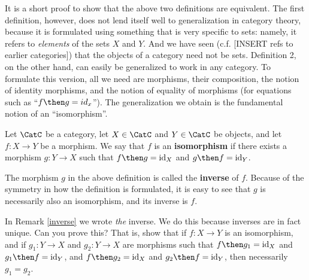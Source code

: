 It is a short proof to show that the above two definitions are equivalent. The first definition, however, does not lend itself well to generalization in category theory, because it is formulated using something that is very specific to sets: namely, it refers to \emph{elements} of the sets $X$ and $Y$. And we have seen (c.f. [INSERT refs to earlier categories]) that the objects of a category need not be sets. Definition 2, on the other hand, can easily be generalized to work in any category. To formulate this version, all we need are morphisms, their composition, the notion of identity morphisms, and the notion of equality of morphisms (for equations such as ``$f \then g = id_x$''). The generalization we obtain is the fundamental notion of an ``isomorphism''.



\begin{shaded}
\begin{definition}[Isomorphism]
Let $\CatC$ be a category, let $X \in \CatC$ and $Y \in \CatC$ be objects, and let $f: X \rightarrow Y$ be a morphism. We say that $f$ is an \textbf{isomorphism} if there exists a morphism $g: Y \rightarrow X$ such that $f \then g = \text{id}_X$ and $g \then f = \text{id}_Y$. 
\end{definition}

\begin{remark}\label{inverse}
The morphism $g$ in the above definition is called the \textbf{inverse} of $f$. Because of the symmetry in how the definition is formulated, it is easy to see that $g$ is necessarily also an isomorphism, and its inverse is $f$. 
\end{remark}
\end{shaded}

\begin{exercise}
In Remark \ref{inverse} we wrote \emph{the} inverse. We do this because inverses are in fact unique. Can you prove this?
That is, show that if $f: X \rightarrow Y$ is an isomorphism, and if $g_1: Y \rightarrow X$ and $g_2: Y \rightarrow X$ are morphisms such that $f \then g_1 = \text{id}_X$ and $g_1 \then f = \text{id}_Y$, and $f \then g_2 = \text{id}_X$ and $g_2 \then f = \text{id}_Y$, then necessarily $g_1 = g_2$. 
\end{exercise}

